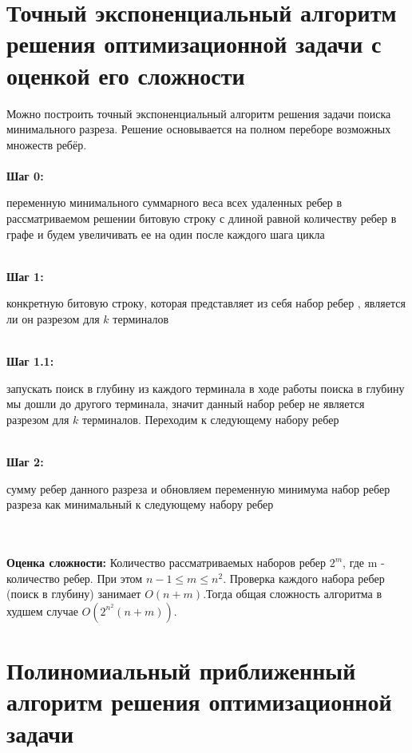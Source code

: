 \section{Точный экспоненциальный алгоритм решения оптимизационной задачи с оценкой его сложности}

Можно построить точный экспоненциальный алгоритм решения задачи поиска минимального разреза. Решение основывается на полном переборе возможных множеств ребёр. 
\\\\\textbf{Шаг 0:}
\begin{itemize}
     переменную минимального суммарного веса всех удаленных ребер в рассматриваемом решении
     битовую строку с длиной равной количеству ребер в графе и будем увеличивать ее на один после каждого шага цикла
\end{itemize}
\\\textbf{Шаг 1:}
\begin{itemize}
     конкретную битовую строку, которая представляет из себя набор ребер
    , является ли он разрезом для \(k\) терминалов
\end{itemize}
\\\textbf{Шаг 1.1:}
\begin{itemize}
     запускать поиск в глубину из каждого терминала 
     в ходе работы поиска в глубину мы дошли до другого терминала, значит данный набор ребер не является разрезом для \(k\) терминалов. Переходим к следующему набору ребер
\end{itemize}
\\\textbf{Шаг 2:}
\begin{itemize}    
     сумму ребер данного разреза и обновляем переменную минимума
     набор ребер разреза как минимальный
     к следующему набору ребер
\end{itemize}
\\
\vspace{5mm}
\\\textbf{Оценка сложности:}
Количество рассматриваемых наборов ребер \(2^m\), где m - количество ребер. При этом \(n-1\leq m\leq{n^2}\). Проверка каждого набора ребер (поиск в глубину) занимает \(O(n+m)\).Тогда общая сложность алгоритма в худшем случае \(O(2^{n^2}(n + m))\).
\section{Полиномиальный приближенный алгоритм решения оптимизационной задачи}

